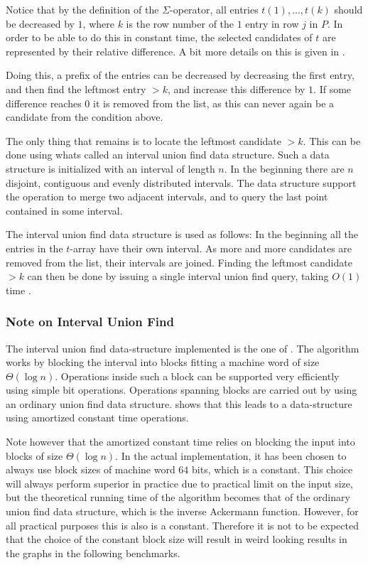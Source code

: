 \documentclass[twoside,11pt,openright]{report}
\begin{document}
Notice that by the definition of the $\Sigma$-operator, all entries $t(1), \dots, t(k)$ should be decreased by $1$, where $k$ is the row number of the $1$ entry in row $j$ in $P$. In order to be able to do this in constant time, the selected candidates of $t$ are represented by their relative difference. A bit more details on this is given in \cite[Lemma 2, p. 234]{Gawrychowski:2012:FAC:2422024.2422048}.

Doing this, a prefix of the entries can be decreased by decreasing the first entry, and then find the leftmost entry $> k$, and increase this difference by $1$. If some difference reaches $0$ it is removed from the list, as this can never again be a candidate from the condition above.

The only thing that remains is to locate the leftmost candidate $> k$. This can be done using whats called an interval union find data structure. Such a data structure is initialized with an interval of length $n$. In the beginning there are $n$ disjoint, contiguous and evenly distributed intervals. The data structure support the operation to merge two adjacent intervals, and to query the last point contained in some interval.

The interval union find data structure is used as follows: In the beginning all the entries in the $t$-array have their own interval. As more and more candidates are removed from the list, their intervals are joined. Finding the leftmost candidate $> k$ can then be done by issuing a single interval union find query, taking $O(1)$ time \cite{Itai06lineartime}.

\subsubsection{Note on Interval Union Find}
\label{sec:algorithm:interval-union-find}
The interval union find data-structure implemented is the one of \cite{Itai06lineartime}. The algorithm works by blocking the interval into blocks fitting a machine word of size $\Theta(\log{n})$. Operations inside such a block can be supported very efficiently using simple bit operations. Operations spanning blocks are carried out by using an ordinary union find data structure. \cite{Itai06lineartime} shows that this leads to a data-structure using amortized constant time operations.

 Note however that the amortized constant time relies on blocking the input into blocks of size $\Theta(\log{n})$. In the actual implementation, it has been chosen to always use block sizes of machine word $64$ bits, which is a constant. This choice will always perform superior in practice due to practical limit on the input size, but the theoretical running time of the algorithm becomes that of the ordinary union find data structure, which is the inverse Ackermann function. However, for all practical purposes this is also is a constant. Therefore it is not to be expected that the choice of the constant block size will result in weird looking results in the graphs in the following benchmarks.
\end{document}
